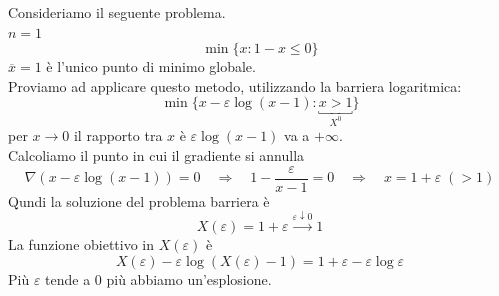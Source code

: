 \begin{example}
Consideriamo il seguente problema. \\
$n=1$
$$\min \{ x : 1-x \leq 0 \}$$
$\overline{x} = 1$ \`e l'unico punto di minimo globale. \\
Proviamo ad applicare questo metodo, utilizzando la barriera
logaritmica:
$$ \min \{x - \varepsilon \log{(x-1)} : \underbracket{x > 1}_{X^{0} } 
\}$$
per $x \rightarrow 0$
il rapporto tra $x$ \`e $\varepsilon \log(x-1)$ va a $+ \infty$. \\
Calcoliamo il punto in cui il gradiente si annulla
$$\nabla (x - \varepsilon \log(x-1)) =0  \quad \Rightarrow \quad
 1- \dfrac{\varepsilon}{x-1} = 0 \quad 
\Rightarrow \quad  x = 1 + \varepsilon \; (>1)$$
Qundi la soluzione del problema barriera \`e
$$ X(\varepsilon) = 1 + \varepsilon \xrightarrow{\varepsilon \downarrow 0 } 1 $$
La funzione obiettivo in $X(\varepsilon)$ \`e
$$ X(\varepsilon) - \varepsilon \log (X(\varepsilon) -1)
= 1 + \varepsilon - \varepsilon \log \varepsilon
 $$
Pi\`u $\varepsilon$ tende a 0 pi\`u abbiamo un'esplosione.
\end{example}

